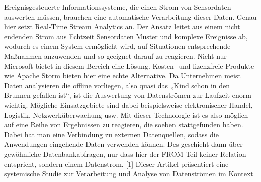 Ereignisgesteuerte Informationssysteme, die einen Strom von Sensordaten auswerten müssen, brauchen eine automatische Verarbeitung dieser Daten. Genau hier setzt Real-Time Stream Analytics an. Der Ansatz leitet aus einem nicht endenden Strom aus Echtzeit Sensordaten Muster und komplexe Ereignisse ab, wodurch es einem System ermöglicht wird, auf Situationen entsprechende Maßnahmen anzuwenden und so geeignet darauf zu reagieren. Nicht nur Microsoft bietet in diesem Bereich eine Lösung. Kosten- und lizenzfreie Produkte wie Apache Storm bieten hier eine echte Alternative. 
Da Unternehmen meist Daten analysieren die offline vorliegen, also quasi das „Kind schon in den Brunnen gefallen ist“, ist die Auswertung von Datenströmen zur Laufzeit enorm wichtig. Mögliche Einsatzgebiete sind dabei beispielsweise elektronischer Handel, Logistik, Netzwerküberwachung usw. 
Mit dieser Technologie ist es also möglich auf eine Reihe von Ergebnissen zu reagieren, die soeben stattgefunden haben. Dabei hat man eine Verbindung zu externen Datenquellen, sodass die Anwendungen eingehende Daten verwenden können. Des geschieht dann über gewöhnliche Datenbankabfragen, nur dass hier der FROM-Teil keiner Relation entspricht, sondern einem Datenstrom. [1]
Dieser Artikel präsentiert eine systemische Studie zur Verarbeitung und Analyse von Datenströmen im Kontext

